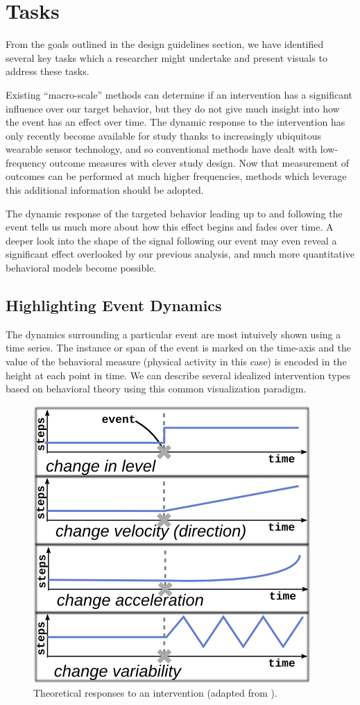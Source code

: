 \section{Tasks}
From the goals outlined in the design guidelines section, we have identified several key tasks which a researcher might undertake and present visuals to address these tasks.

Existing ``macro-scale'' methods can determine if an intervention has a significant influence over our target behavior, but they do not give much insight into how the event has an effect over time.
The dynamic response to the intervention has only recently become available for study thanks to increasingly ubiquitous wearable sensor technology, and so conventional methods have dealt with low-frequency outcome measures with clever study design.
Now that measurement of outcomes can be performed at much higher frequencies, methods which leverage this additional information should be adopted.

The dynamic response of the targeted behavior leading up to and following the event tells us much more about how this effect begins and fades over time.
A deeper look into the shape of the signal following our event may even reveal a significant effect overlooked by our previous analysis, and much more quantitative behavioral models become possible.

\subsection{Highlighting Event Dynamics}
The dynamics surrounding a particular event are most intuively shown using a time series.
The instance or span of the event is marked on the time-axis and the value of the behavioral measure (physical activity in this case) is encoded in the height at each point in time.
We can describe several idealized intervention types based on behavioral theory using this common visualization paradigm.

\begin{figure}
\centering
\includegraphics[width=0.6\columnwidth]{./img/exampleDynamicSignals.png}
\caption{Theoretical responses to an intervention (adapted from \cite{glass1975}).}
\label{fig:exampleSignals}
\end{figure}

